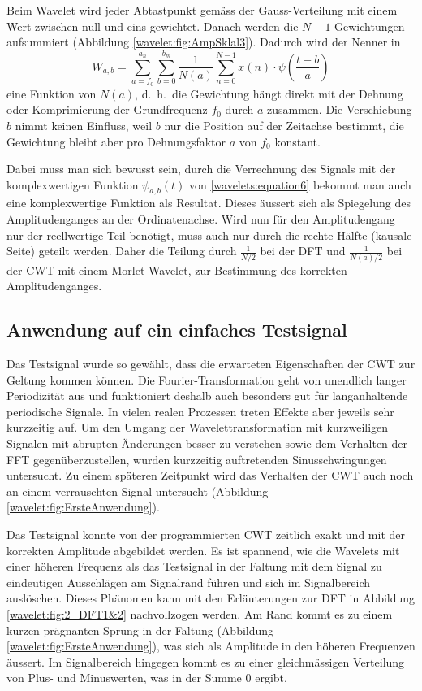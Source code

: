 Beim Wavelet wird jeder Abtastpunkt gemäss der Gauss-Verteilung mit
einem Wert zwischen null und eins gewichtet.
Danach werden die $N-1$ Gewichtungen aufsummiert (Abbildung
\ref{wavelet:fig:AmpSklal3}).
Dadurch wird der Nenner in
\[W_{a,b}=\sum_{a=f_0}^{a_n}\sum_{b=0}^{b_m}\frac{1}{N(a)}\sum_{n=0}^{N-1}
x(n)\cdot\psi\left(\frac{t-b}{a}\right)\] eine Funktion von $N(a)$,
d.~h.~die Gewichtung hängt direkt mit der Dehnung oder Komprimierung
der Grundfrequenz $f_0$ durch $a$ zusammen.
Die Verschiebung $b$ nimmt keinen Einfluss, weil $b$ nur die Position
auf der Zeitachse bestimmt, die Gewichtung bleibt aber pro
Dehnungsfaktor $a$ von $f_0$ konstant.

Dabei muss man sich bewusst sein, durch die Verrechnung des Signals
mit der komplexwertigen Funktion \(\psi_{a,b}(t)\) von
\eqref{wavelets:equation6} bekommt man auch eine komplexwertige
Funktion als Resultat.
Dieses äussert sich als Spiegelung des Amplitudenganges an der
Ordinatenachse.
Wird nun für den Amplitudengang nur der reellwertige Teil benötigt,
muss auch nur durch die rechte Hälfte (kausale Seite) geteilt werden.
Daher die Teilung durch $\frac{1}{N/2}$ bei der DFT und
\(\frac{1}{N(a)/2}\) bei der CWT mit einem Morlet-Wavelet, zur
Bestimmung des korrekten Amplitudenganges.

\subsection{Anwendung auf ein einfaches Testsignal
	\label{wavelets:subsection:ErsteAnwendung}}
Das Testsignal wurde so gewählt, dass die erwarteten Eigenschaften
der CWT zur Geltung kommen können.
Die Fourier-Transformation geht von unendlich langer Periodizität
aus und funktioniert deshalb auch besonders gut für langanhaltende
periodische Signale.
In vielen realen Prozessen treten Effekte aber jeweils sehr kurzzeitig auf.
Um den Umgang der Wavelettransformation mit kurzweiligen Signalen
mit abrupten Änderungen besser zu verstehen sowie dem Verhalten der
FFT gegenüberzustellen, wurden kurzzeitig auftretenden Sinusschwingungen
untersucht.
Zu einem späteren Zeitpunkt wird das Verhalten der CWT auch noch
an einem verrauschten Signal untersucht (Abbildung
\ref{wavelet:fig:ErsteAnwendung}).

Das Testsignal konnte von der programmierten CWT zeitlich exakt und
mit der korrekten Amplitude abgebildet werden.
Es ist spannend, wie die Wavelets mit einer höheren Frequenz als
das Testsignal in der Faltung mit dem Signal zu eindeutigen Ausschlägen
am Signalrand führen und sich im Signalbereich auslöschen.
Dieses Phänomen kann mit den Erläuterungen zur DFT in Abbildung
\ref{wavelet:fig:2_DFT1&2} nachvollzogen werden.
Am Rand kommt es zu einem kurzen prägnanten Sprung in der Faltung
(Abbildung \ref{wavelet:fig:ErsteAnwendung}), was sich als Amplitude
in den höheren Frequenzen äussert.
Im Signalbereich hingegen kommt es zu einer gleichmässigen Verteilung
von Plus- und Minuswerten, was in der Summe $0$ ergibt.

